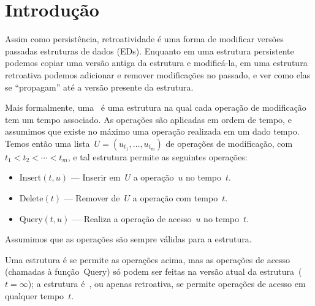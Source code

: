 \documentclass[main.tex]{subfiles}
\begin{document}
\chapter*{Introdução}

Assim como persistência, retroatividade é uma forma de modificar versões passadas estruturas de dados (EDs). Enquanto em uma estrutura persistente podemos copiar uma versão antiga da estrutura e modificá-la, em uma estrutura retroativa podemos adicionar e remover modificações no passado, e ver como elas se ``propagam'' até a versão presente da estrutura.

Mais formalmente, uma~ é uma estrutura na qual cada operação de modificação tem um tempo associado. As operações são aplicadas em ordem de tempo, e assumimos que existe no máximo uma operação realizada em um dado tempo. Temos então uma lista~${U = (u_{t_1}, \ldots, u_{t_m})}$ de operações de modificação, com~${t_1 < t_2 < \cdots < t_m}$, e tal estrutura permite as seguintes operações:

\begin{itemize}
	\item $\text{Insert}(t, u)$ --- Inserir em~$U$ a operação~$u$ no tempo~$t$.
	\item $\text{Delete}(t)$ --- Remover de~$U$ a operação com tempo~$t$.
	\item $\text{Query}(t, u)$ --- Realiza a operação de acesso~$u$ no tempo~$t$.
\end{itemize}

Assumimos que as operações são sempre válidas para a estrutura.

Uma estrutura é  se permite as operações acima, mas as operações de acesso (chamadas à função~Query) só podem ser feitas na versão atual da estrutura~(${t = \infty}$); a estrutura é~, ou apenas retroativa, se permite operações de acesso em qualquer tempo~$t$.
\end{document}
